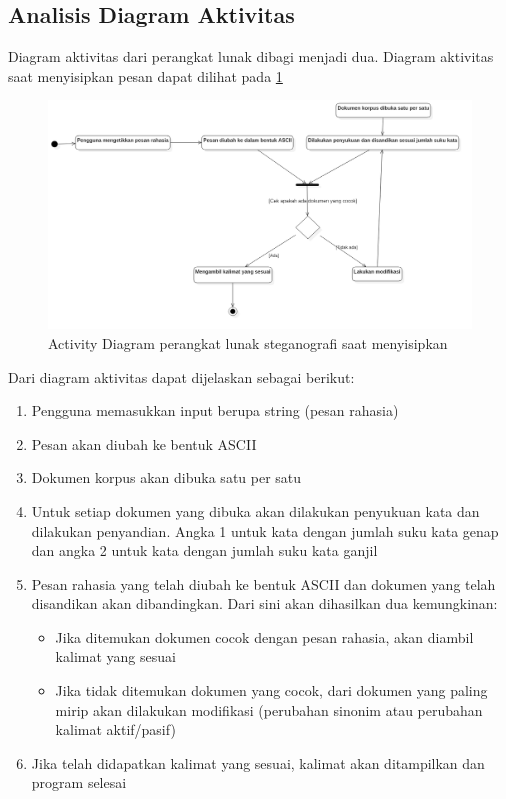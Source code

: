 \subsection{Analisis Diagram Aktivitas}

Diagram aktivitas dari perangkat lunak dibagi menjadi dua. Diagram aktivitas saat menyisipkan pesan dapat dilihat pada \ref{fig:4_activity-penyisipan}

\begin{figure}[H]
	\centering
	\includegraphics[scale=0.5]{Gambar/activity-penyisipan}
	\caption{Activity Diagram perangkat lunak steganografi saat menyisipkan} 
	\label{fig:4_activity-penyisipan}
\end{figure}

Dari diagram aktivitas dapat dijelaskan sebagai berikut:

\begin{enumerate}
	\item Pengguna memasukkan input berupa string (pesan rahasia)
	\item Pesan akan diubah ke bentuk ASCII
	\item Dokumen korpus akan dibuka satu per satu
	\item Untuk setiap dokumen yang dibuka akan dilakukan penyukuan kata dan dilakukan penyandian. Angka 1 untuk kata dengan jumlah suku kata genap dan angka 2 untuk kata dengan jumlah suku kata ganjil
	\item Pesan rahasia yang telah diubah ke bentuk ASCII dan dokumen yang telah disandikan akan dibandingkan. Dari sini akan dihasilkan dua kemungkinan:
	\begin{itemize}
		\item Jika ditemukan dokumen cocok dengan pesan rahasia, akan diambil kalimat yang sesuai
		\item Jika tidak ditemukan dokumen yang cocok, dari dokumen yang paling mirip akan dilakukan modifikasi (perubahan sinonim atau perubahan kalimat aktif/pasif)
	\end{itemize}
	\item Jika telah didapatkan kalimat yang sesuai, kalimat akan ditampilkan dan program selesai
\end{enumerate}

